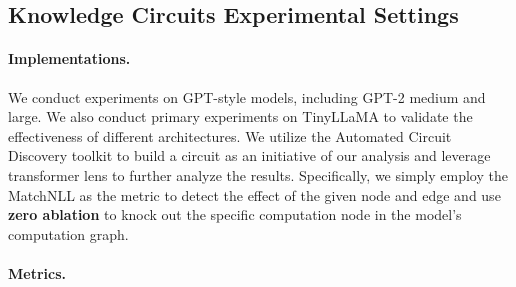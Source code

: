 

\subsection{Knowledge Circuits Experimental Settings}





\paragraph{Implementations.}
\label{subsec:exp_setting}
We conduct experiments on GPT-style models, including GPT-2 medium and large.
We also conduct primary experiments on TinyLLaMA \cite{zhang2024tinyllama} to validate the effectiveness of different architectures.
We utilize the Automated Circuit Discovery \cite{acdc} toolkit to build a circuit as an initiative of our analysis and leverage transformer lens \cite{nanda2022transformerlens} to further analyze the results.
Specifically, we simply employ the MatchNLL \cite{acdc} as the metric to detect the effect of the given node and edge and use \textbf{zero ablation} to knock out the specific computation node in the model's computation graph.

\paragraph{Metrics.}


